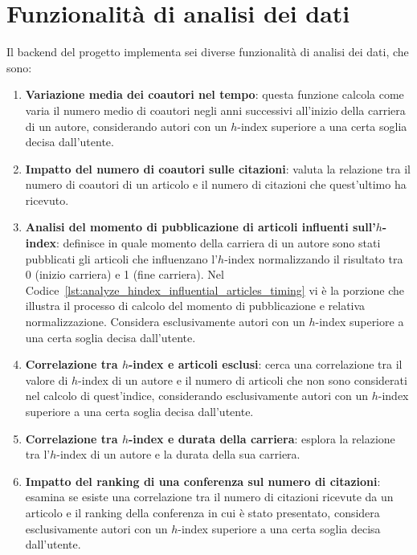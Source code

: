 \section{Funzionalità di analisi dei dati}
Il backend del progetto implementa sei diverse funzionalità di analisi dei dati, che sono:
\begin{enumerate}
    \item \textbf{Variazione media dei coautori nel tempo}: questa funzione calcola come varia il numero medio di coautori negli anni successivi all'inizio della carriera di un autore, considerando autori con un $h$-index superiore a una certa soglia decisa dall'utente.

    \item \textbf{Impatto del numero di coautori sulle citazioni}: valuta la relazione tra il numero di coautori di un articolo e il numero di citazioni che quest'ultimo ha ricevuto.

    \item \textbf{Analisi del momento di pubblicazione di articoli influenti sull'$h$-index}: definisce in quale momento della carriera di un autore sono stati pubblicati gli articoli che influenzano l'$h$-index normalizzando il risultato tra 0 (inizio carriera) e 1 (fine carriera). Nel Codice~\ref{lst:analyze_hindex_influential_articles_timing} vi è la porzione che illustra il processo di calcolo del momento di pubblicazione e relativa normalizzazione.
    Considera esclusivamente autori con un $h$-index superiore a una certa soglia decisa dall'utente.

    \item \textbf{Correlazione tra $h$-index e articoli esclusi}: cerca una correlazione tra il valore di $h$-index di un autore e il numero di articoli che non sono considerati nel calcolo di quest'indice, considerando esclusivamente autori con un $h$-index superiore a una certa soglia decisa dall'utente.

    \item \textbf{Correlazione tra $h$-index e durata della carriera}: esplora la relazione tra l'$h$-index di un autore e la durata della sua carriera.

    \item \textbf{Impatto del ranking di una conferenza sul numero di citazioni}: esamina se esiste una correlazione tra il numero di citazioni ricevute da un articolo e il ranking della conferenza in cui è stato presentato, considera esclusivamente autori con un $h$-index superiore a una certa soglia decisa dall'utente.

\end{enumerate}

